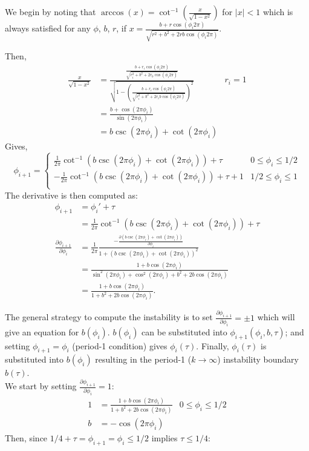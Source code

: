 \indent We begin by noting that $\arccos(x) = \cot^{-1}(\frac{x}{\sqrt{1-x^2}})$ for $|x|<1$ which is always satisfied for any $\phi$, $b$, $r$, if $x=\frac{b+r \cos(\phi_i 2\pi)}{\sqrt{r^2+b^2+2rb\cos(\phi_i 2\pi)}}$. 

Then, 
\begin{align}
    \frac{x}{\sqrt{1-x^2}} &= \frac{\frac{b+r_i \cos(\phi_i 2\pi)}{\sqrt{r_i^2+b^2+2r_b\cos(\phi_i 2\pi)}}}{\sqrt{1-(\frac{b+r_i \cos(\phi_i 2\pi)}{\sqrt{r_i^2+b^2+2r_i b\cos(\phi_i 2\pi)}})^2}} & r_i = 1 \nonumber \\
    &= \frac{b + \cos(2\pi \phi_i)}{\sin(2\pi \phi_i)} \nonumber \\
    &= b\csc(2\pi \phi_i) + \cot(2\pi \phi_i)
\end{align} 
Gives, 
\begin{equation}
    \phi_{i+1} =
\begin{cases}
        \frac{1}{2\pi}\cot^{-1}(b\csc(2\pi \phi_i)+\cot(2\pi \phi_i))+ \tau & 0 \leq \phi_i \leq 1/2 \\
       -\frac{1}{2\pi}\cot^{-1}(b\csc(2\pi \phi_i)+\cot(2\pi \phi_i))+ \tau + 1 & 1/2 \leq \phi_i \leq 1 \\
    \end{cases}
\end{equation}
The derivative is then computed as:
\begin{align}
    \phi_{i+1} &= \phi_i' + \tau \nonumber \\
    &= \frac{1}{2\pi}\cot^{-1}(b\csc(2\pi \phi_i)+\cot(2\pi \phi_i))+ \tau \nonumber \\
    \frac{\partial \phi_{i+1}}{\partial \phi_i} &= \frac{1}{2\pi} \frac{-\frac{\partial (b\csc(2\pi \phi_i)+\cot(2\pi \phi_i))}{\partial \phi_i}}{1+(b\csc(2\pi \phi_i)+\cot(2\pi \phi_i))^2} \nonumber \\
    &= \frac{1+b\cos(2\pi \phi_i)}{\sin^2(2\pi \phi_i)+\cos^2(2\pi \phi_i) + b^2 + 2b\cos(2\pi \phi_i)} \nonumber \\
    &=\frac{1+b\cos(2\pi \phi_i)}{1 + b^2 + 2b\cos(2\pi \phi_i)}.
\end{align}

\indent The general strategy to compute the instability is to set $\frac{\partial \phi_{i+1}}{\partial \phi_i} = \pm 1$ which will give an equation for $b(\phi_i)$. $b(\phi_i)$ can be substituted into $\phi_{i+1}(\phi_i,b,\tau)$; and setting $\phi_{i+1} = \phi_i$ (period-1 condition) gives $\phi_i(\tau)$. Finally, $\phi_i(\tau)$ is substituted into $b(\phi_i)$ resulting in the period-1 ($k\rightarrow \infty$) instability boundary $b(\tau)$.\\
We start by setting $\frac{\partial \phi_{i+1}}{\partial \phi_i} = 1$:
\begin{align}
    1 &= \frac{1+b\cos(2\pi \phi_i)}{1 + b^2 + 2b\cos(2\pi \phi_i)} & 0\leq \phi_i \leq 1/2 \nonumber \\
    b&= -\cos(2\pi \phi_i)
\end{align} 
Then, since $1/4 + \tau = \phi_{i+1} = \phi_i \leq 1/2$ implies $\tau \leq 1/4$:

